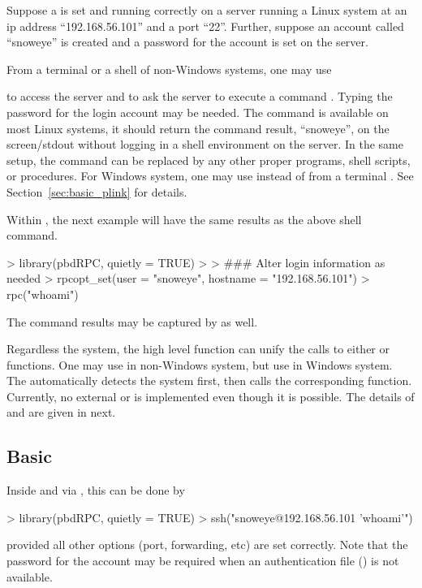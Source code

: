 Suppose a  is set and running correctly on a server running a Linux
system at an ip address ``192.168.56.101'' and a port ``22''.
Further, suppose an account
called ``snoweye'' is created and a password for the account is set on
the server.

From a terminal or a shell of non-Windows systems, one may use
to access the server and to ask the server to execute a command .
Typing the password for the login account may be needed.
The command  is available on most Linux systems, it should
return the command result, ``snoweye'', on the screen/stdout without
logging in a shell environment on the server.
In the same setup, the command  can be replaced
by any other proper programs, shell scripts, or procedures.
For Windows system, one may use  instead of 
from a terminal . See Section~\ref{sec:basic_plink} for details.

Within , the next example will have the
same results as the above shell command.
\begin{Code}[title=Basic \code{rpc()} in \pkg{pbdRPC} and \proglang{R}]
> library(pbdRPC, quietly = TRUE)
>
> ### Alter login information as needed
> rpcopt_set(user = "snoweye", hostname = "192.168.56.101")
> rpc("whoami")
\end{Code}
The command results may be captured by  as well.

Regardless the system,
the high level function  can unify the calls to
either  or  functions.
One may use  in non-Windows system, but
use  in Windows system.
The  automatically
detects the system first, then calls the corresponding function.
Currently, no external  or  is implemented
even though it is possible.
The details of  and  are given in next.


\subsection[Basic \code{ssh()}]{Basic }
\label{sec:basic_ssh}

Inside  and via , this can be done by
\begin{Code}[title=Basic \code{ssh()} in \pkg{pbdRPC} and \proglang{R}]
> library(pbdRPC, quietly = TRUE)
> ssh("snoweye@192.168.56.101 'whoami'")
\end{Code}
provided all other options (port, forwarding, etc) are set correctly.
Note that the password for the account may be required when an
authentication file () is not available.

